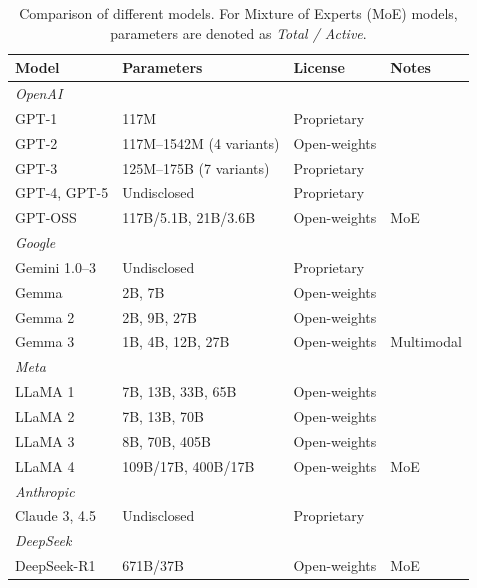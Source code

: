 \begin{table}[htbp]
\centering
\small
\caption{Comparison of different models. For Mixture of Experts (MoE) models, parameters are denoted as \textit{Total / Active}.}
\label{tab:llm-parameters}
\begin{tabular}{llll}
\toprule
\textbf{Model} & \textbf{Parameters} & \textbf{License} & \textbf{Notes} \\
\midrule
\multicolumn{4}{l}{\textit{OpenAI}} \\
GPT-1 & 117M & Proprietary & \cite{Radford2018ImprovingLU, Radford2019LanguageMA} \\
GPT-2 & 117M--1542M (4 variants) & Open-weights & \cite{Radford2019LanguageMA} \\
GPT-3 & 125M--175B (7 variants) & Proprietary & \cite{brown2020languagemodelsfewshotlearners} \\
GPT-4, GPT-5 & Undisclosed & Proprietary & \cite{openai2024gpt4technicalreport, singh2025openaigpt5card} \\
GPT-OSS & 117B/5.1B, 21B/3.6B & Open-weights & MoE \cite{openai2025gptoss120bgptoss20bmodel} \\
\midrule
\multicolumn{4}{l}{\textit{Google}} \\
Gemini 1.0--3 & Undisclosed & Proprietary & \cite{geminiteam2025geminifamilyhighlycapable, comanici2025gemini25pushingfrontier} \\
Gemma & 2B, 7B & Open-weights & \cite{gemmateam2024gemmaopenmodelsbased} \\
Gemma 2 & 2B, 9B, 27B & Open-weights & \cite{gemmateam2024gemma2improvingopen} \\
Gemma 3 & 1B, 4B, 12B, 27B & Open-weights & Multimodal \cite{gemmateam2025gemma3technicalreport} \\
\midrule
\multicolumn{4}{l}{\textit{Meta}} \\
LLaMA 1 & 7B, 13B, 33B, 65B & Open-weights & \cite{touvron2023llamaopenefficientfoundation} \\
LLaMA 2 & 7B, 13B, 70B & Open-weights & \cite{touvron2023llama2openfoundation} \\
LLaMA 3 & 8B, 70B, 405B & Open-weights & \cite{grattafiori2024llama3herdmodels} \\
LLaMA 4 & 109B/17B, 400B/17B & Open-weights & MoE \cite{meta2025llama4} \\
\midrule
\multicolumn{4}{l}{\textit{Anthropic}} \\
Claude 3, 4.5 & Undisclosed & Proprietary & \cite{TheC3} \\
\midrule
\multicolumn{4}{l}{\textit{DeepSeek}} \\
DeepSeek-R1 & 671B/37B & Open-weights & MoE \cite{Guo_2025} \\
\bottomrule
\end{tabular}
\end{table}

